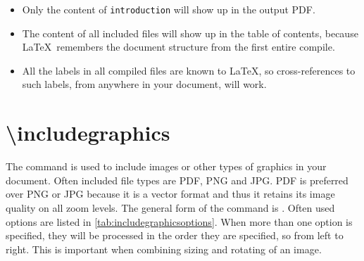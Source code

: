 \begin{enumerate}
\begin{enumerate}
\begin{itemize}
            \item Only the content of \verb|introduction| will show up in the output PDF.
            \item The content of all included files will show up in the table of contents, because \LaTeX\ remembers the document structure from the first entire compile.
            \item All the labels in all compiled files are known to \LaTeX, so cross-references to such labels, from anywhere in your document, will work.
        \end{itemize}
    \end{enumerate}
\end{enumerate}

\section{\textbackslash includegraphics}
The  command is used to include images or other types of graphics in your document. Often included file types are PDF, PNG and JPG. PDF is preferred over PNG or JPG because it is a vector format and thus it retains its image quality on all zoom levels. 
The general form of the command is . Often used options are listed in \cref{tab:includegraphicsoptions}. When more than one option is specified, they will be processed in the order they are specified, so from left to right. This is important when combining sizing and rotating of an image.


